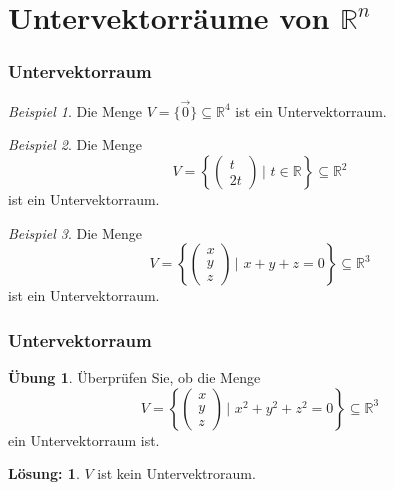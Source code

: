 \documentclass[hyperref={pdfpagelabels=false}]{beamer}
\theoremstyle{plain}%
\theoremstyle{definition}
\newtheorem*{uebung}{Übung}
\newtheorem*{sol}{Lösung:}
\theoremstyle{remark}
\newtheorem*{beispiel}{Beispiel}
\def \R{\mathbb R}
\newcommand{\vektor}[1]{\overrightarrow{#1}}
\begin{document}
\section{Untervektorräume von $\R^n$}
\begin{frame}
\frametitle{Untervektorraum}

\begin{beispiel}
Die Menge $V = \{\vektor{0} \} \subseteq \R^4$ ist ein Untervektorraum.
\end{beispiel}

\pause 

\begin{beispiel}
Die Menge 
	$$ V = \left\{ \begin{pmatrix} t \\ 2t  \end{pmatrix} \,\vert \,\, t \in \R \right\} \subseteq \R^2 $$
ist ein Untervektorraum. 
\end{beispiel}

\pause 

\begin{beispiel}
Die Menge 
	$$ V = \left\{ \begin{pmatrix} x \\ y \\ z \end{pmatrix} \,\vert \,\, x + y + z = 0 \right\} \subseteq \R^3 $$
ist ein Untervektorraum. 
\end{beispiel}
\end{frame}

\begin{frame}
\frametitle{Untervektorraum}

\begin{uebung}
Überprüfen Sie, ob die Menge 
	$$ V = \left\{ \begin{pmatrix} x \\ y \\ z \end{pmatrix} \,\vert \,\, x^2 + y^2 + z^2 = 0 \right\} \subseteq \R^3 $$
ein Untervektorraum ist. 
\end{uebung}

\pause \pause 

\begin{sol}
$V$ ist kein Untervektroraum. 
\end{sol}
\end{frame}
\end{document}
